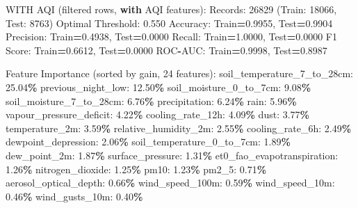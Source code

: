 \documentclass[
  letterpaper,
  DIV=11,
  numbers=noendperiod]{scrartcl}
\newenvironment{Shaded}{\begin{snugshade}}{\end{snugshade}}
\newcommand{\BuiltInTok}[1]{#1}
\newcommand{\ControlFlowTok}[1]{\textcolor[rgb]{0.13,0.29,0.53}{\textbf{#1}}}
\newcommand{\DecValTok}[1]{\textcolor[rgb]{0.00,0.00,0.81}{#1}}
\newcommand{\FloatTok}[1]{\textcolor[rgb]{0.00,0.00,0.81}{#1}}
\newcommand{\NormalTok}[1]{#1}
\newcommand{\OperatorTok}[1]{\textcolor[rgb]{0.81,0.36,0.00}{\textbf{#1}}}
\begin{document}
\begin{Shaded}
\begin{Highlighting}[]
\NormalTok{WITH AQI (filtered rows, }\ControlFlowTok{with}\NormalTok{ AQI features):}
\NormalTok{  Records: }\DecValTok{26829}\NormalTok{ (Train: }\DecValTok{18066}\NormalTok{, Test: }\DecValTok{8763}\NormalTok{)}
\NormalTok{  Optimal Threshold: }\FloatTok{0.550}
\NormalTok{  Accuracy: Train}\OperatorTok{=}\FloatTok{0.9955}\NormalTok{, Test}\OperatorTok{=}\FloatTok{0.9904}
\NormalTok{  Precision: Train}\OperatorTok{=}\FloatTok{0.4938}\NormalTok{, Test}\OperatorTok{=}\FloatTok{0.0000}
\NormalTok{  Recall: Train}\OperatorTok{=}\FloatTok{1.0000}\NormalTok{, Test}\OperatorTok{=}\FloatTok{0.0000}
\NormalTok{  F1 Score: Train}\OperatorTok{=}\FloatTok{0.6612}\NormalTok{, Test}\OperatorTok{=}\FloatTok{0.0000}
\NormalTok{  ROC}\OperatorTok{{-}}\NormalTok{AUC: Train}\OperatorTok{=}\FloatTok{0.9998}\NormalTok{, Test}\OperatorTok{=}\FloatTok{0.8987}

\NormalTok{  Feature Importance (}\BuiltInTok{sorted}\NormalTok{ by gain, }\DecValTok{24}\NormalTok{ features):}
\NormalTok{    soil\_temperature\_7\_to\_28cm: }\FloatTok{25.04}\OperatorTok{\%}
\NormalTok{    previous\_night\_low: }\FloatTok{12.50}\OperatorTok{\%}
\NormalTok{    soil\_moisture\_0\_to\_7cm: }\FloatTok{9.08}\OperatorTok{\%}
\NormalTok{    soil\_moisture\_7\_to\_28cm: }\FloatTok{6.76}\OperatorTok{\%}
\NormalTok{    precipitation: }\FloatTok{6.24}\OperatorTok{\%}
\NormalTok{    rain: }\FloatTok{5.96}\OperatorTok{\%}
\NormalTok{    vapour\_pressure\_deficit: }\FloatTok{4.22}\OperatorTok{\%}
\NormalTok{    cooling\_rate\_12h: }\FloatTok{4.09}\OperatorTok{\%}
\NormalTok{    dust: }\FloatTok{3.77}\OperatorTok{\%}
\NormalTok{    temperature\_2m: }\FloatTok{3.59}\OperatorTok{\%}
\NormalTok{    relative\_humidity\_2m: }\FloatTok{2.55}\OperatorTok{\%}
\NormalTok{    cooling\_rate\_6h: }\FloatTok{2.49}\OperatorTok{\%}
\NormalTok{    dewpoint\_depression: }\FloatTok{2.06}\OperatorTok{\%}
\NormalTok{    soil\_temperature\_0\_to\_7cm: }\FloatTok{1.89}\OperatorTok{\%}
\NormalTok{    dew\_point\_2m: }\FloatTok{1.87}\OperatorTok{\%}
\NormalTok{    surface\_pressure: }\FloatTok{1.31}\OperatorTok{\%}
\NormalTok{    et0\_fao\_evapotranspiration: }\FloatTok{1.26}\OperatorTok{\%}
\NormalTok{    nitrogen\_dioxide: }\FloatTok{1.25}\OperatorTok{\%}
\NormalTok{    pm10: }\FloatTok{1.23}\OperatorTok{\%}
\NormalTok{    pm2\_5: }\FloatTok{0.71}\OperatorTok{\%}
\NormalTok{    aerosol\_optical\_depth: }\FloatTok{0.66}\OperatorTok{\%}
\NormalTok{    wind\_speed\_100m: }\FloatTok{0.59}\OperatorTok{\%}
\NormalTok{    wind\_speed\_10m: }\FloatTok{0.46}\OperatorTok{\%}
\NormalTok{    wind\_gusts\_10m: }\FloatTok{0.40}\OperatorTok{\%}


\end{Highlighting}
\end{Shaded}
\end{document}
